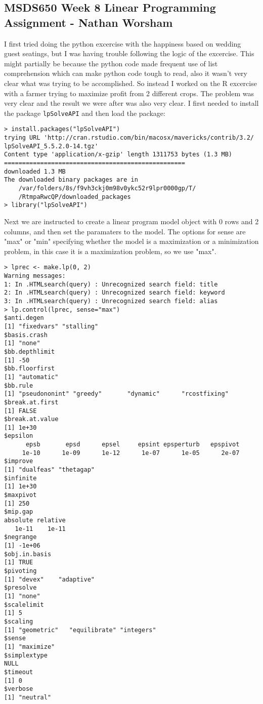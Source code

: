 \documentclass[10pt]{article}
\begin{document}
\subsection*{MSDS650 Week 8 Linear Programming Assignment - Nathan Worsham}
I first tried doing the python excercise with the happiness based on wedding guest seatings, but I was having trouble following the logic of the excercise. This might partially be because the python code made frequent use of list comprehension which can make python code tough to read, also it wasn't very clear what was trying to be accomplished. So instead I worked on the R excercise with a farmer trying to maximize profit from 2 different crops. The problem was very clear and the result we were after was also very clear.
I first needed to install the package \verb|lpSolveAPI| and then load the package:
\begin{verbatim}
> install.packages("lpSolveAPI")
trying URL 'http://cran.rstudio.com/bin/macosx/mavericks/contrib/3.2/
lpSolveAPI_5.5.2.0-14.tgz'
Content type 'application/x-gzip' length 1311753 bytes (1.3 MB)
==================================================
downloaded 1.3 MB
The downloaded binary packages are in
	/var/folders/8s/f9vh3ckj0m98v0ykc52r9lpr0000gp/T/
	/RtmpaRwcQP/downloaded_packages
> library("lpSolveAPI")
\end{verbatim}
Next we are instructed to create a linear program model object with 0 rows and 2 columns, and then set the paramaters to the model. The options for sense are "max" or "min" specifying whether the model is a maximization or a minimization problem, in this case it is a maximization problem, so we use "max".
\begin{verbatim}
> lprec <- make.lp(0, 2)
Warning messages:
1: In .HTMLsearch(query) : Unrecognized search field: title
2: In .HTMLsearch(query) : Unrecognized search field: keyword
3: In .HTMLsearch(query) : Unrecognized search field: alias
> lp.control(lprec, sense="max")
$anti.degen
[1] "fixedvars" "stalling" 
$basis.crash
[1] "none"
$bb.depthlimit
[1] -50
$bb.floorfirst
[1] "automatic"
$bb.rule
[1] "pseudononint" "greedy"       "dynamic"      "rcostfixing" 
$break.at.first
[1] FALSE
$break.at.value
[1] 1e+30
$epsilon
      epsb       epsd      epsel     epsint epsperturb   epspivot 
     1e-10      1e-09      1e-12      1e-07      1e-05      2e-07 
$improve
[1] "dualfeas" "thetagap"
$infinite
[1] 1e+30
$maxpivot
[1] 250
$mip.gap
absolute relative 
   1e-11    1e-11 
$negrange
[1] -1e+06
$obj.in.basis
[1] TRUE
$pivoting
[1] "devex"    "adaptive"
$presolve
[1] "none"
$scalelimit
[1] 5
$scaling
[1] "geometric"   "equilibrate" "integers"   
$sense
[1] "maximize"
$simplextype
NULL
$timeout
[1] 0
$verbose
[1] "neutral"
\end{verbatim}
\end{document}
